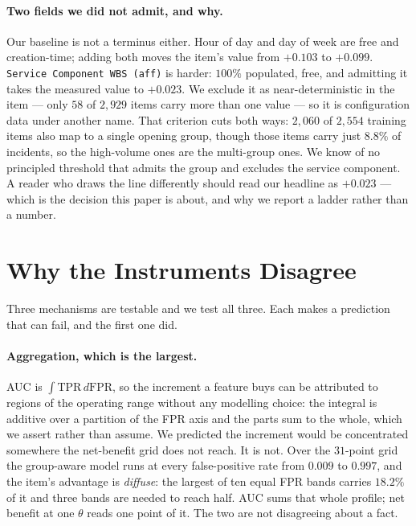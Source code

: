 \documentclass[preprint,12pt]{elsarticle}
\begin{document}
\paragraph{Two fields we did not admit, and why.}
Our baseline is not a terminus either. Hour of day and day of week are free
and creation-time; adding both moves the item's value from $+0.103$ to
$+0.099$. \texttt{Service Component WBS (aff)} is harder: $100\%$ populated,
free, and admitting it takes the measured value to $+0.023$. We exclude it as
near-deterministic in the item --- only $58$ of $2{,}929$ items carry more
than one value --- so it is configuration data under another name. That
criterion cuts both ways: $2{,}060$ of $2{,}554$ training items also map to a
single opening group, though those items carry just $8.8\%$ of incidents, so
the high-volume ones are the multi-group ones. We know of no principled
threshold that admits the group and excludes the service component. A reader
who draws the line differently should read our headline as $+0.023$ --- which
is the decision this paper is about, and why we report a ladder rather than a
number.

\section{Why the Instruments Disagree}
\label{app:whydisagree}

Three mechanisms are testable and we test all three. Each makes a prediction
that can fail, and the first one did.

\paragraph{Aggregation, which is the largest.}
AUC is $\int \text{TPR}\,d\text{FPR}$, so the increment a feature buys can be
attributed to regions of the operating range without any modelling choice: the
integral is additive over a partition of the FPR axis and the parts sum to the
whole, which we assert rather than assume. We predicted the increment would be
concentrated somewhere the net-benefit grid does not reach. It is not. Over the
$31$-point grid the group-aware model runs at every false-positive rate from
$0.009$ to $0.997$, and the item's advantage is \emph{diffuse}: the largest of
ten equal FPR bands carries $18.2\%$ of it and three bands are needed to reach
half. AUC sums that whole profile; net benefit at one $\theta$ reads one point
of it. The two are not disagreeing about a fact.
\end{document}
